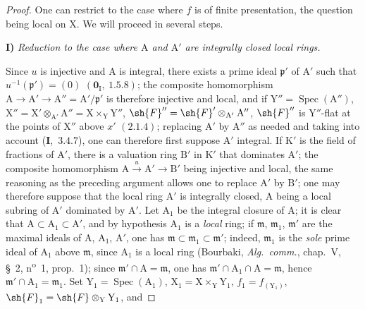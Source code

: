 \begin{proof}
One can restrict to the case where $f$ is of finite presentation, the question being local
on $\mathrm{X}$. We will proceed in several steps.

\medskip
\noindent\textbf{I)} \emph{Reduction to the case where $\mathrm{A}$ and $\mathrm{A}'$ are integrally closed local rings.}

\medskip
Since $u$ is injective and $\mathrm{A}$ is integral, there exists a prime ideal $\mathfrak{p}'$ of $\mathrm{A}'$ such that
$u^{-1}(\mathfrak{p}')=(0)$ $(\mathbf{0}_\mathrm{I},~1.5.8)$; the composite homomorphism $\mathrm{A}\to\mathrm{A}'\to\mathrm{A}''=\mathrm{A}'/\mathfrak{p}'$ is therefore injective
and local, and if $\mathrm{Y}''=\operatorname{Spec}(\mathrm{A}'')$, $\mathrm{X}''=\mathrm{X}'\otimes_{\mathrm{A}'}\mathrm{A}''=\mathrm{X}\times_\mathrm{Y}\mathrm{Y}''$, $\sh{F}''=\sh{F}'\otimes_{\mathrm{A}'}\mathrm{A}''$, $\sh{F}''$ is $\mathrm{Y}''$-flat
at the points of $\mathrm{X}''$ above $x'$ $(2.1.4)$; replacing $\mathrm{A}'$ by $\mathrm{A}''$ as needed and taking
into account (\textbf{I},~$3.4.7$), one can therefore first suppose $\mathrm{A}'$ integral. If $\mathrm{K}'$ is the field of
fractions of $\mathrm{A}'$, there is a valuation ring $\mathrm{B}'$ in $\mathrm{K}'$ that dominates $\mathrm{A}'$; the composite
homomorphism $\mathrm{A}\xrightarrow{u}\mathrm{A}'\to\mathrm{B}'$ being injective and local, the same reasoning as
the preceding argument allows one to replace $\mathrm{A}'$ by $\mathrm{B}'$; one may therefore suppose that the local ring $\mathrm{A}'$ is integrally closed,
$\mathrm{A}$ being a local subring of $\mathrm{A}'$ dominated by $\mathrm{A}'$. Let $\mathrm{A}_1$ be the integral closure of $\mathrm{A}$; it is clear that
$\mathrm{A}\subset\mathrm{A}_1\subset\mathrm{A}'$, and by hypothesis $\mathrm{A}_1$ is a \emph{local} ring;
if $\mathfrak{m}$, $\mathfrak{m}_1$, $\mathfrak{m}'$ are the maximal ideals of $\mathrm{A}$, $\mathrm{A}_1$, $\mathrm{A}'$, one has $\mathfrak{m}\subset\mathfrak{m}_1\subset\mathfrak{m}'$; indeed, $\mathfrak{m}_1$ is
the \emph{sole} prime ideal of $\mathrm{A}_1$ above $\mathfrak{m}$, since $\mathrm{A}_1$ is a local ring (Bourbaki,
\emph{Alg.\ comm.}, chap.~V, \S~2, n\textsuperscript{o}~1, prop.~1); since $\mathfrak{m}'\cap\mathrm{A}=\mathfrak{m}$, one has $\mathfrak{m}'\cap\mathrm{A}_1\cap\mathrm{A}=\mathfrak{m}$,
hence $\mathfrak{m}'\cap\mathrm{A}_1=\mathfrak{m}_1$. Set $\mathrm{Y}_1=\operatorname{Spec}(\mathrm{A}_1)$, $\mathrm{X}_1=\mathrm{X}\times_\mathrm{Y}\mathrm{Y}_1$, $f_1=f_{(\mathrm{Y}_1)}$, $\sh{F}_1=\sh{F}\otimes_\mathrm{Y}\mathrm{Y}_1$, and

\end{proof}
